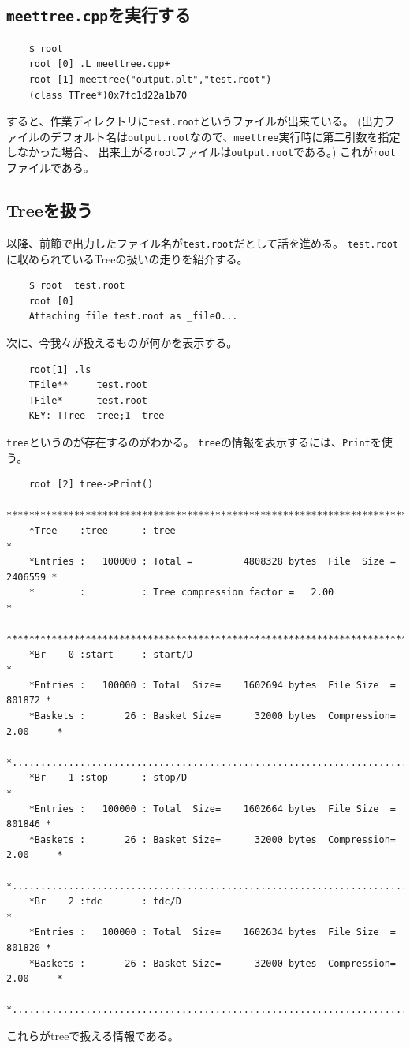   \subsection{\texttt{meettree.cpp}を実行する}
\begin{verbatim}
	$ root
	root [0] .L meettree.cpp+
	root [1] meettree("output.plt","test.root")
	(class TTree*)0x7fc1d22a1b70
\end{verbatim}
すると、作業ディレクトリに\verb|test.root|というファイルが出来ている。
(出力ファイルのデフォルト名は\verb|output.root|なので、\verb|meettree|実行時に第二引数を指定しなかった場合、
出来上がる\verb|root|ファイルは\verb|output.root|である。)
これが\verb|root|ファイルである。

  \subsection{Treeを扱う}
  以降、前節で出力したファイル名が\verb|test.root|だとして話を進める。
  \verb|test.root|に収められているTreeの扱いの走りを紹介する。
\begin{verbatim}
	$ root  test.root 
	root [0] 
	Attaching file test.root as _file0...
\end{verbatim}
次に、今我々が扱えるものが何かを表示する。
\begin{verbatim}
	root[1] .ls
	TFile**		test.root
	TFile*		test.root
	KEY: TTree	tree;1	tree
\end{verbatim}
\verb|tree|というのが存在するのがわかる。
\verb|tree|の情報を表示するには、\verb|Print|を使う。
\begin{verbatim}
	root [2] tree->Print()
	******************************************************************************
	*Tree    :tree      : tree                                                   *
	*Entries :   100000 : Total =         4808328 bytes  File  Size =    2406559 *
	*        :          : Tree compression factor =   2.00                       *
	******************************************************************************
	*Br    0 :start     : start/D                                                *
	*Entries :   100000 : Total  Size=    1602694 bytes  File Size  =     801872 *
	*Baskets :       26 : Basket Size=      32000 bytes  Compression=   2.00     *
	*............................................................................*
	*Br    1 :stop      : stop/D                                                 *
	*Entries :   100000 : Total  Size=    1602664 bytes  File Size  =     801846 *
	*Baskets :       26 : Basket Size=      32000 bytes  Compression=   2.00     *
	*............................................................................*
	*Br    2 :tdc       : tdc/D                                                  *
	*Entries :   100000 : Total  Size=    1602634 bytes  File Size  =     801820 *
	*Baskets :       26 : Basket Size=      32000 bytes  Compression=   2.00     *
	*............................................................................*
\end{verbatim}
これらがtreeで扱える情報である。

